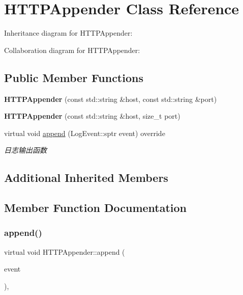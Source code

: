 \hypertarget{classHTTPAppender}{}\section{H\+T\+T\+P\+Appender Class Reference}
\label{classHTTPAppender}


Inheritance diagram for H\+T\+T\+P\+Appender\+:


Collaboration diagram for H\+T\+T\+P\+Appender\+:
\subsection*{Public Member Functions}
\begin{DoxyCompactItemize}
\item 
\mbox{\label{classHTTPAppender_a7c0a17c48d8359e6a6a1c7aa2a665e79}} 
{\bfseries H\+T\+T\+P\+Appender} (const std\+::string \&host, const std\+::string \&port)
\item 
\mbox{\label{classHTTPAppender_a2ea214dafa19537ea84c1b03cad7a981}} 
{\bfseries H\+T\+T\+P\+Appender} (const std\+::string \&host, size\+\_\+t port)
\item 
virtual void \hyperlink{classHTTPAppender_a775ecde5945f66aef33d67093e5274e5}{append} (Log\+Event\+::sptr event) override
\begin{DoxyCompactList}\small\item\em 日志输出函数 \end{DoxyCompactList}\end{DoxyCompactItemize}
\subsection*{Additional Inherited Members}


\subsection{Member Function Documentation}
\mbox{\label{classHTTPAppender_a775ecde5945f66aef33d67093e5274e5}} 
\subsubsection{\texorpdfstring{append()}{append()}}
{\footnotesize\ttfamily virtual void H\+T\+T\+P\+Appender\+::append (\begin{DoxyParamCaption}\item[{Log\+Event\+::sptr}]{event }\end{DoxyParamCaption})\hspace{0.3cm}{\ttfamily [override]}, {\ttfamily [virtual]}}




